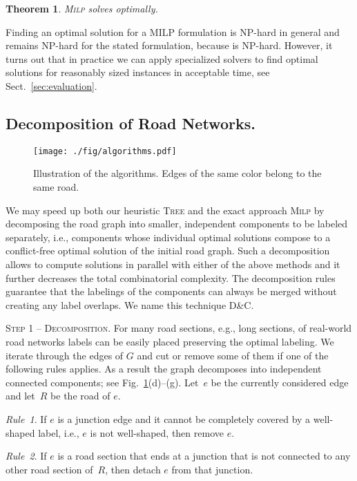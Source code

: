 \documentclass[a4paper,11pt]{article}
\newtheorem{theorem}{Theorem}
\newcommand{\RuleA}{\textit{Rule~1}\xspace}
\newcommand{\RuleB}{\textit{Rule~2}\xspace}
\newcommand{\TreeAlgo}{\textsc{Tree}\xspace}
\newcommand{\ILPAlgo}{\textsc{Milp}\xspace}
\newcommand{\Shredder}{\textsc{D\&C}}
\begin{document}
\begin{theorem}
\ILPAlgo solves \MaxTotalCovering optimally.
\end{theorem}

Finding an optimal solution for a MILP formulation is NP-hard in
general and remains NP-hard for the stated formulation, because
\MaxTotalCovering is NP-hard. However, it turns out that in practice we can
apply specialized solvers to find optimal solutions for reasonably sized instances in acceptable time, see Sect.~\ref{sec:evaluation}. 


\subsection{Decomposition of Road Networks.}
\begin{figure}[t]
\centering
\texttt{[image: ./fig/algorithms.pdf]}
\caption{Illustration of the algorithms. Edges of the same color belong to the same road.}
\label{fig:rules}
\end{figure}

We may speed up both our heuristic \TreeAlgo and the exact approach \ILPAlgo by decomposing the road graph into smaller, independent components to be labeled separately, i.e., components whose individual optimal solutions compose to a conflict-free optimal solution of the initial road graph.  Such a decomposition allows to compute solutions in parallel with either of the above methods and it further decreases the total combinatorial complexity. The decomposition rules guarantee that the labelings of the components can always be merged without creating any label overlaps.
We name this technique \Shredder.


\textsc{Step 1 -- Decomposition.} For many road sections, e.g., long
sections, of real-world road networks labels can be easily placed
preserving the optimal labeling.  We iterate through the edges of $G$ and cut or remove some of them if one of the following rules applies. As a result the graph decomposes into independent connected
components; see Fig.~\ref{fig:rules}(d)--(g). Let~$e$ be the
currently considered edge and let~$R$ be the road of $e$. 


\RuleA. If $e$ is a junction edge and it cannot be completely covered
by a well-shaped label, i.e., $e$ is not well-shaped, then remove $e$.


\RuleB. If $e$ is a road section that ends at a junction that is not
connected to any other road section of~$R$, then detach $e$ from that junction.
\end{document}
